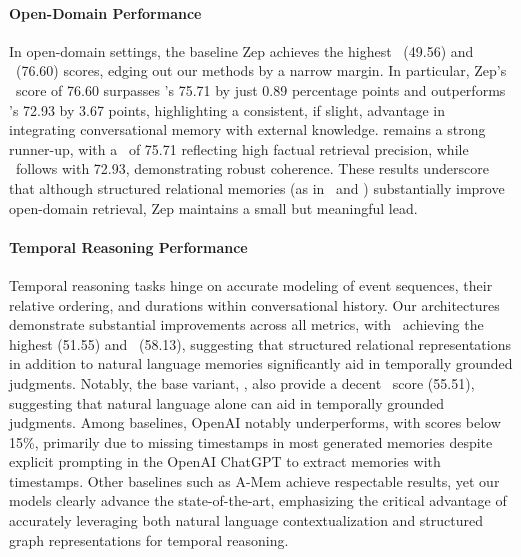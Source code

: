 \paragraph{Open-Domain Performance}
In open-domain settings, the baseline Zep achieves the highest \Fone\ (49.56) and \Judge\ (76.60) scores, edging out our methods by a narrow margin.  In particular, Zep’s \Judge\ score of 76.60 surpasses \memp’s 75.71 by just 0.89 percentage points and outperforms \mem’s 72.93 by 3.67 points, highlighting a consistent, if slight, advantage in integrating conversational memory with external knowledge. \memp remains a strong runner-up, with a \Judge\ of 75.71 reflecting high factual retrieval precision, while \mem~follows with 72.93, demonstrating robust coherence. These results underscore that although structured relational memories (as in \mem\ and \memp) substantially improve open-domain retrieval, Zep maintains a small but meaningful lead.


\paragraph{Temporal Reasoning Performance}
Temporal reasoning tasks hinge on accurate modeling of event sequences, their relative ordering, and durations within conversational history. Our architectures demonstrate substantial improvements across all metrics, with \memp~achieving the highest \Fone (51.55) and \Judge~(58.13), suggesting that structured relational representations in addition to natural language memories significantly aid in temporally grounded judgments. Notably, the base variant, \mem, also provide a decent \Judge~score (55.51), suggesting that natural language alone can aid in temporally grounded judgments. 
Among baselines, OpenAI notably underperforms, with scores below 15\%, primarily due to missing timestamps in most generated memories despite explicit prompting in the OpenAI ChatGPT to extract memories with timestamps. Other baselines such as A-Mem achieve respectable results, yet our models clearly advance the state-of-the-art, emphasizing the critical advantage of accurately leveraging both natural language contextualization and structured graph representations for temporal reasoning.


